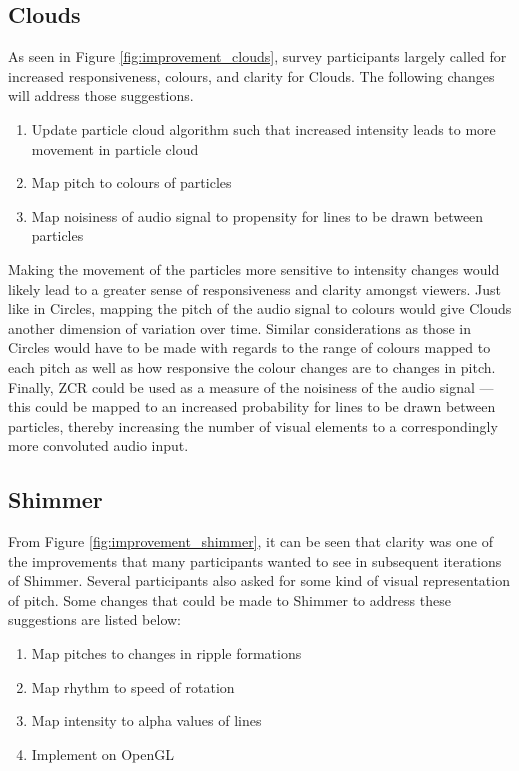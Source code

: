 \documentclass[../initial_thesis.tex]{subfiles}
\begin{document}
\subsection{Clouds}
As seen in Figure \ref{fig:improvement_clouds}, survey participants largely called for increased responsiveness, colours, and clarity for Clouds. The following changes will address those suggestions.

\begin{enumerate}
\item {Update particle cloud algorithm such that increased intensity leads to more movement in particle cloud}
\item {Map pitch to colours of particles}
\item {Map noisiness of audio signal to propensity for lines to be drawn between particles}
\end{enumerate}

Making the movement of the particles more sensitive to intensity changes would likely lead to a greater sense of responsiveness and clarity amongst viewers. Just like in Circles, mapping the pitch of the audio signal to colours would give Clouds another dimension of variation over time. Similar considerations as those in Circles would have to be made with regards to the range of colours mapped to each pitch as well as how responsive the colour changes are to changes in pitch. Finally, ZCR could be used as a measure of the noisiness of the audio signal --- this could be mapped to an increased probability for lines to be drawn between particles, thereby increasing the number of visual elements to a correspondingly more convoluted audio input. 

\subsection{Shimmer}\label{sec:lowlevelaudio}
From Figure \ref{fig:improvement_shimmer}, it can be seen that clarity was one of the improvements that many participants wanted to see in subsequent iterations of Shimmer. Several participants also asked for some kind of visual representation of pitch. Some changes that could be made to Shimmer to address these suggestions are listed below:

\begin{enumerate}
\item {Map pitches to changes in ripple formations}
\item {Map rhythm to speed of rotation}
\item {Map intensity to alpha values of lines}
\item {Implement on OpenGL}
\end{enumerate}
\end{document}
